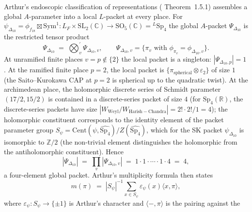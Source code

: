 \begin{remark}
\label{rem:dl-global-packet-closure}
Arthur's endoscopic classification of representations
(\cite{Arthur2013Endoscopic} Theorem~1.5.1) assembles a global
$A$-parameter into a local $L$-packet at every place. For
$\psi_{\Delta_{10}} = \phi_{f_{18}} \boxtimes \mathrm{Sym}^1\colon
L_F \times \mathrm{SL}_2(\mathbb{C}) \to \mathrm{SO}_5(\mathbb{C}) =
{}^L\mathrm{Sp}_4$ the global $A$-packet $\Psi_{\Delta_{10}}$ is the
restricted tensor product
\begin{equation}
\label{eq:global-packet}
 \Psi_{\Delta_{10}}
 \;=\;
 \bigotimes_v^\prime \Psi_{\Delta_{10}, v},
 \qquad
 \Psi_{\Delta_{10}, v} = \{ \pi_v \text{ with } \phi_{\pi_v} = \phi_{\Delta_{10}, v} \}.
\end{equation}
At unramified finite places $v = p \notin \{2\}$ the local packet is a
singleton: $|\Psi_{\Delta_{10}, p}| = 1$. At the ramified finite place
$p = 2$, the local packet is
$\{\pi_{\mathrm{spherical}} \otimes \varepsilon_2\}$ of size $1$
(the Saito--Kurokawa CAP at $p = 2$ is spherical up to the
quadratic twist). At the archimedean place, the holomorphic
discrete series of Schmidt parameter $(17/2, 15/2)$ is contained in a
discrete-series packet of size $4$ (for $\mathrm{Sp}_4(\mathbb{R})$,
the discrete-series packets have size $|W_{\mathrm{Weyl}} /
W_{\mathrm{Harish-Chandra}}| = 2! \cdot 2! / 1 = 4$); the holomorphic
constituent corresponds to the identity element of the packet
parameter group
$S_\psi = \mathrm{Cent}(\psi, \widehat{\mathrm{Sp}_4}) / Z(\widehat{\mathrm{Sp}_4})$,
which for the SK packet $\psi_{\Delta_{10}}$ is isomorphic to
$\mathbb{Z}/2$ (the non-trivial element distinguishes the holomorphic
from the antiholomorphic constituent). Hence
\begin{equation}
\label{eq:packet-size}
 |\Psi_{\Delta_{10}}|
 \;=\;
 \prod_v |\Psi_{\Delta_{10}, v}|
 \;=\;
 1 \cdot 1 \cdot \cdots \cdot 1 \cdot 4
 \;=\;
 4,
\end{equation}
a four-element global packet. Arthur's multiplicity formula
\cite[Thm.\ 1.5.2]{Arthur2013Endoscopic} then states
\begin{equation}
\label{eq:multiplicity}
 m(\pi)
 \;=\;
 |S_\psi|^{-1}
 \sum_{x \in S_\psi} \varepsilon_\psi(x) \langle x, \pi \rangle,
\end{equation}
where $\varepsilon_\psi\colon S_\psi \to \{\pm 1\}$ is Arthur's
character and $\langle -, \pi \rangle$ is the pairing against the

\end{remark}
